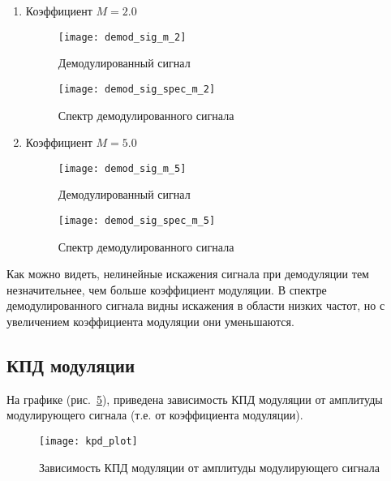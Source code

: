 \begin{enumerate}
\item Коэффициент $ M = 2.0$
\begin{figure}[H]
	\begin{center}
		\texttt{[image: demod\_sig\_m\_2]}
		\caption{Демодулированный сигнал } 
		\label{pic:signal_demodulated_2_0} %
	\end{center}
\end{figure}
\begin{figure}[H]
	\begin{center}
		\texttt{[image: demod\_sig\_spec\_m\_2]}
		\caption{Спектр демодулированного сигнала} 
		\label{pic:demod_sig_spec_2_0} %
	\end{center}
\end{figure}

\item Коэффициент $ M = 5.0$
\begin{figure}[H]
	\begin{center}
		\texttt{[image: demod\_sig\_m\_5]}
		\caption{Демодулированный сигнал } 
		\label{pic:signal_demodulated_2_0} %
	\end{center}
\end{figure}
\begin{figure}[H]
	\begin{center}
		\texttt{[image: demod\_sig\_spec\_m\_5]}
		\caption{Спектр демодулированного сигнала} 
		\label{pic:demod_sig_spec_2_0} %
	\end{center}
\end{figure}
\end{enumerate}

Как можно видеть, нелинейные искажения сигнала при демодуляции тем незначительнее, чем больше коэффициент модуляции.
В спектре демодулированного сигнала видны искажения в области низких частот, но с 
увеличением коэффициента модуляции они уменьшаются.

\subsection{КПД модуляции}
На графике (рис.~\ref{pic:Kpd_ampmod}), приведена зависимость КПД модуляции от амплитуды модулирующего сигнала
 (т.е. от коэффициента модуляции).
\begin{figure}[H]
	\begin{center}
		\texttt{[image: kpd\_plot]}
		\caption{Зависимость КПД модуляции от амплитуды модулирующего сигнала} 
		\label{pic:Kpd_ampmod} %
	\end{center}
\end{figure}

